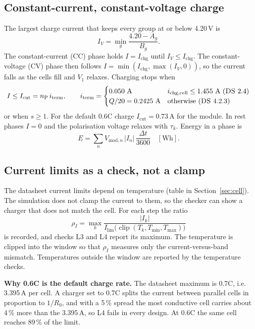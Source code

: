 \documentclass[11pt,a4paper]{article}
\newcommand{\ds}[1]{\textsc{DS}~#1}
\newcommand{\nP}{n_{\mathrm{P}}}
\begin{document}
\subsection{Constant-current, constant-voltage charge}
The largest charge current that keeps every group at or below 4.20\,V is
\begin{equation}
I_{V}=\min_g\frac{4.20-A_g}{B_g}.
\end{equation}
The constant-current (CC) phase holds $I=I_{\mathrm{chg}}$ until $I_V\le I_{\mathrm{chg}}$. The constant-voltage (CV) phase then follows $I=\min(I_{\mathrm{chg}},\max(I_V,0))$, so the current falls as the cells fill and $V_{1}$ relaxes. Charging stops when
\begin{equation}
I\le I_{\mathrm{cut}}=\nP\,i_{\mathrm{term}},\qquad i_{\mathrm{term}}=\begin{cases}0.050\ \mathrm{A}& i_{\mathrm{chg,cell}}\le1.455\ \mathrm{A}\ (\ds{2.4})\\ Q/20=0.2425\ \mathrm{A}&\text{otherwise}\ (\ds{4.2.3})\end{cases}
\end{equation}
or when $s\ge1$. For the default 0.6C charge $I_{\mathrm{cut}}=0.73$\,A for the module. In rest phases $I=0$ and the polarisation voltage relaxes with $\tau_k$. Energy in a phase is
\begin{equation}
E=\sum_n V_{\mathrm{mod},n}\,|I_n|\,\frac{\Delta t}{3600}\quad[\mathrm{Wh}].
\end{equation}

\subsection{Current limits as a check, not a clamp}
The datasheet current limits depend on temperature (table in Section~\ref{sec:cell}). The simulation does not clamp the current to them, so the checker can show a charger that does not match the cell. For each step the ratio
\begin{equation}
\rho_I=\max_k\frac{|I_k|}{I_{\lim}\big(\operatorname{clip}(T_k,T_{\min},T_{\max})\big)}
\end{equation}
is recorded, and checks L3 and L4 report its maximum. The temperature is clipped into the window so that $\rho_I$ measures only the current-versus-band mismatch. Temperatures outside the window are reported by the temperature checks.

\textbf{Why 0.6C is the default charge rate.} The datasheet maximum is 0.7C, i.e. 3.395\,A per cell. A charger set to 0.7C splits the current between parallel cells in proportion to $1/R_0$, and with a 5\,\% spread the most conductive cell carries about 4\,\% more than the 3.395\,A, so L4 fails in every design. At 0.6C the same cell reaches 89\,\% of the limit.
\end{document}
